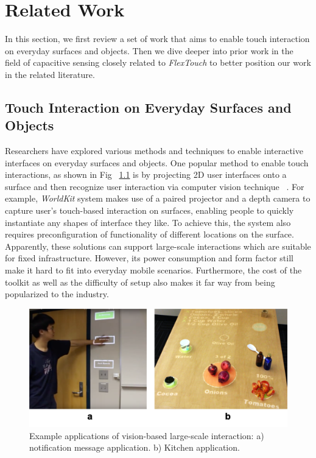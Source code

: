 \chapter{Related Work}
In this section, we first review a set of work that aims to enable touch interaction on everyday surfaces and objects. Then we dive deeper into prior work in the field of capacitive sensing closely related to \textit{FlexTouch} to better position our work in the related literature.

\section{Touch Interaction on Everyday Surfaces and Objects}
Researchers have explored various methods and techniques to enable interactive interfaces on everyday surfaces and objects. One popular method to enable touch interactions, as shown in Fig ~\ref{fig:cv-large-scale-interaction} is by projecting 2D user interfaces onto a surface and then recognize user interaction via computer vision technique ~\cite{pinhanez2001everywhere, Fails-2002-Light-Widgets, Wilson-2010-Light-Space, Xiao-WorldKit}. For example, \textit{WorldKit} system makes use of a paired projector and a depth camera to capture user's touch-based interaction on surfaces, enabling people to quickly instantiate any shapes of interface they like. To achieve this, the system also requires preconfiguration of functionality of different locations on the surface. Apparently, these solutions can support large-scale interactions which are suitable for fixed infrastructure. However, its power consumption and form factor still make it hard to fit into everyday mobile scenarios. Furthermore, the cost of the toolkit as well as the difficulty of setup also makes it far way from being popularized to the industry.

\begin{figure}[ht]
    \centering
	\includegraphics[width=0.78\columnwidth]{figures/cv-large-scale-sensing.png}
	\setlength{\belowcaptionskip}{-6pt}
    \caption{Example applications of vision-based large-scale interaction: a) notification message application. b) Kitchen application.}
    \label{fig:cv-large-scale-interaction}
\end{figure}

